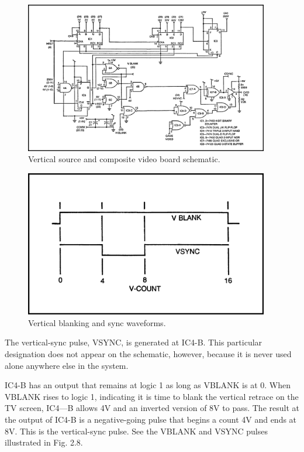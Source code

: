 \documentclass[11pt]{book}              %
\begin{document}
\begin{figure}
    \centering
    \includegraphics[width=0.95\textwidth]{images/fig2-7}
    \caption{Vertical source and composite video board schematic.}
\end{figure}

\begin{figure}
    \centering
    \includegraphics[width=0.95\textwidth]{images/fig2-8}
    \caption{Vertical blanking and sync waveforms.}
\end{figure}

The vertical-sync pulse, VSYNC, is generated at IC4-B. This particular designation does not appear on the schematic, however, because it is never used alone anywhere else in the system.

IC4-B has an output that remains at logic 1 as long as VBLANK is at 0. When VBLANK rises to logic 1, indicating it is time to blank the vertical retrace on the TV screen, IC4—B allows 4V and an inverted version of 8V to pass. The result at the output of IC4-B is a negative-going pulse that begins a count 4V and ends at 8V. This is the vertical-sync pulse. See the VBLANK and VSYNC pulses illustrated in Fig. 2.8.
\end{document}
